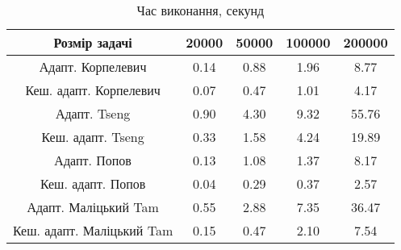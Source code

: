 \begin{table}[H]
	\centering
	\begin{tabular}{|c||c|c|c|c|}\hline
		Розмір задачі & 20000 & 50000 & 100000 & 200000 \\ \hline \hline
		Адапт. Корпелевич & 0.14 & 0.88 & 1.96 & 8.77 \\ \hline
		Кеш. адапт. Корпелевич & 0.07 & 0.47 & 1.01 & 4.17 \\ \hline
		Адапт. Tseng & 0.90 & 4.30 & 9.32 & 55.76 \\ \hline
		Кеш. адапт. Tseng & 0.33 & 1.58 & 4.24 & 19.89 \\ \hline
		Адапт. Попов & 0.13 & 1.08 & 1.37 & 8.17 \\ \hline
		Кеш. адапт. Попов & 0.04 & 0.29 & 0.37 & 2.57 \\ \hline
		Адапт. Маліцький Tam & 0.55 & 2.88 & 7.35 & 36.47 \\ \hline
		Кеш. адапт. Маліцький Tam & 0.15 & 0.47 & 2.10 & 7.54 \\ \hline
	\end{tabular}
	\caption{Час виконання, секунд}
\end{table}
